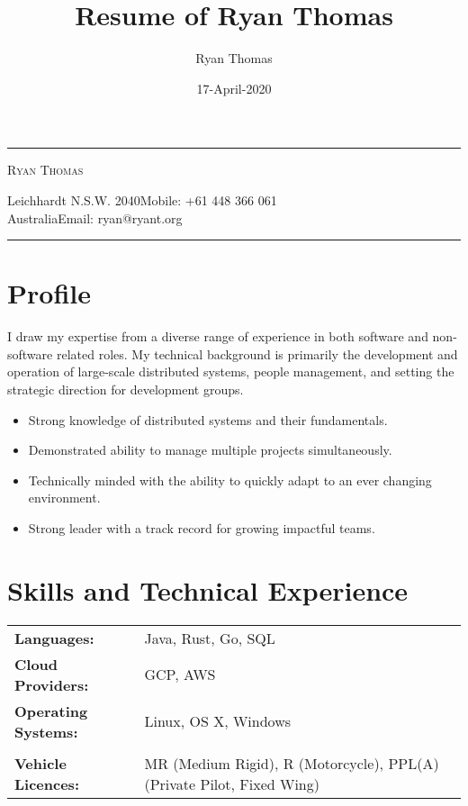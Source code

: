 \documentclass[a4paper]{article}
\author{Ryan Thomas}
\title{Resume of Ryan Thomas}
\date{17-April-2020}
\begin{document}
\newcommand{\ryanHeader}{
\begin{center}
\rule{14.1cm}{0.5mm}
\end{center}
\vspace{-0.5cm}
\begin{center}
\textsc{Ryan Thomas}
\end{center}
\vspace{-0.3cm}
Leichhardt N.S.W. 2040\hfill Mobile: +61 448 366 061~~\\
Australia\hfill Email: ryan@ryant.org
\vspace{-0.3cm}
\begin{center}
\rule{14.1cm}{0.5mm}
\end{center}}

\newcommand{\ryanHeaderSmall}{
\begin{center}
\rule{14.1cm}{0.5mm}
\end{center}
\vspace{-0.55cm}
\begin{center}
\textsc{Ryan Thomas}
\end{center}
\vspace{-0.8cm}
\begin{center}
\rule{14.1cm}{0.5mm}
\end{center}}

\ryanHeader
\section*{Profile}
I draw my expertise from a diverse range of experience in both software and non-software related roles. My technical background is primarily the development and operation of large-scale distributed systems, people management, and setting the strategic direction for development groups.
\begin{itemize}
\item Strong knowledge of distributed systems and their fundamentals.
\item Demonstrated ability to manage multiple projects simultaneously.
\item Technically minded with the ability to quickly adapt to an ever changing environment.
\item Strong leader with a track record for growing impactful teams.
\end{itemize}
\section*{Skills and Technical Experience}
\begin{tabular}{l l}
\textbf{Languages:} & Java, Rust, Go, SQL\\
\textbf{Cloud Providers:} & GCP, AWS\\
\textbf{Operating Systems:} & Linux, OS X, Windows\\\\
\textbf{Vehicle Licences:}&MR (Medium Rigid), R (Motorcycle), PPL(A) (Private Pilot, Fixed Wing)\\
\end{tabular}
\vspace{5pt}
\end{document}
